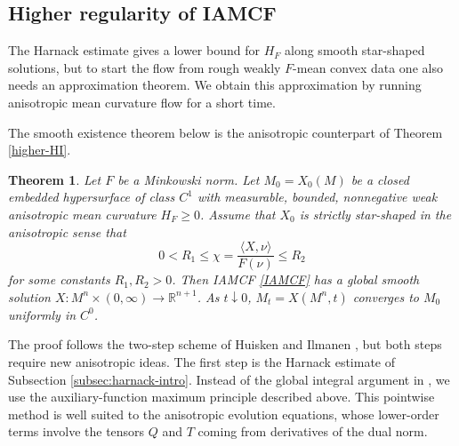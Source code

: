 \documentclass[10pt,a4paper]{amsart}
\newtheorem{theorem}[proposition]{Theorem}
\numberwithin{equation}{section}
\begin{document}
	\subsection{Higher regularity of IAMCF}
	\label{subsec:higher-regularity-intro}
	The Harnack estimate gives a lower bound for $H_F$ along smooth star-shaped solutions, but to start the flow from rough weakly $F$-mean convex data one also needs an approximation theorem. We obtain this approximation by running anisotropic mean curvature flow for a short time. 
    

	The smooth existence theorem below is the anisotropic counterpart of Theorem \ref{higher-HI}.
	

	\begin{theorem}
	\label{higher-our}
		Let $F$ be a Minkowski norm. Let $M_0=X_0(M)$ be a closed embedded hypersurface of class $C^1$ with measurable, bounded, nonnegative weak anisotropic mean curvature $H_F\geq 0$. 
		Assume that $X_0$ is strictly star-shaped in the anisotropic sense that
		\begin{equation*}
			0<R_1\leq \chi=\frac{\langle X,\nu\rangle}{F(\nu)}\leq R_2
		\end{equation*}
		for some constants $R_1,R_2>0$. Then IAMCF \eqref{IAMCF} has a global smooth solution $X:M^n\times(0,\infty)\to\mathbb{R}^{n+1}$. As $t\downarrow 0$, $M_t=X(M^n,t)$ converges to $M_0$ uniformly in $C^0$.
	\end{theorem}

	
	The proof follows the two-step scheme of Huisken and Ilmanen \cite{HI08}, but both steps require new anisotropic ideas. The first step is the Harnack estimate of Subsection \ref{subsec:harnack-intro}. Instead of the global integral argument in \cite{HI08}, we use the auxiliary-function maximum principle described above. This pointwise method is well suited to the anisotropic evolution equations, whose lower-order terms involve the tensors $Q$ and $T$ coming from derivatives of the dual norm.
	
\end{document}
